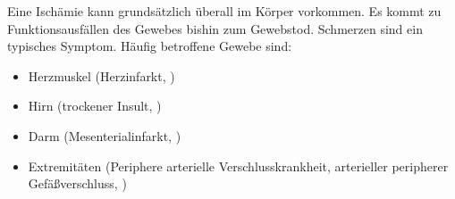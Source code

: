 {%
\label{topic:ischaemie}%
 Eine Ischämie kann
grundsätzlich überall im Körper vorkommen. Es kommt zu
Funktionsausfällen des Gewebes bishin zum Gewebstod.
Schmerzen sind ein typisches Symptom. Häufig betroffene
Gewebe sind:

\begin{itemize}
  \item Herzmuskel (Herzinfarkt,
  )
  \item Hirn (trockener Insult,
  )
  \item Darm (Mesenterialinfarkt,
  )
  \item Extremitäten (Periphere arterielle
  Verschlusskrankheit, arterieller peripherer
  Gefäßverschluss,
  )
\end{itemize}
}
%



